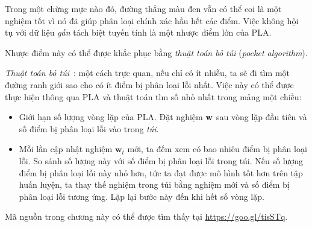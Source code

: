 Trong một chừng mực nào đó, đường thẳng màu đen vẫn có thể coi là một nghiệm tốt vì nó đã giúp phân loại chính xác hầu hết các điểm. Việc không hội tụ với dữ liệu \textit{gần} tách biệt tuyến tính là một nhược điểm lớn của PLA.

Nhược điểm này có thể được khắc phục bằng \textit{thuật toán bỏ túi} (\textit{pocket algorithm}).

\textit{Thuật toán bỏ túi}~\cite{abu2012learning}: một cách trực quan, nếu chỉ có
ít nhiễu, ta sẽ đi tìm một đường ranh giới sao cho có ít điểm bị phân loại lỗi
nhất. Việc này có thể được thực hiện thông qua PLA và thuật toán tìm số nhỏ nhất trong mảng một chiều:
\begin{itemize}
\item Giới hạn số lượng vòng lặp của PLA. Đặt nghiệm $\mathbf{w}$ sau vòng lặp đầu tiên và số điểm bị phân loại lỗi vào trong \textit{túi}.

\item  Mỗi lần cập nhật nghiệm $\mathbf{w}_t$ mới, ta đếm xem có bao nhiêu điểm bị phân loại lỗi. So sánh số lượng này với số điểm bị phân loại lỗi trong túi. Nếu số lượng điểm bị phân loại lỗi này nhỏ hơn, tức ta đạt được mô hình tốt hơn trên tập huấn luyện, ta thay thế nghiệm trong túi bằng nghiệm mới và số điểm bị phân loại lỗi tương ứng. Lặp lại bước này đến khi hết số vòng lặp.
\end{itemize}



Mã nguồn trong chương này có thể được tìm thấy tại \url{https://goo.gl/tisSTq}.







